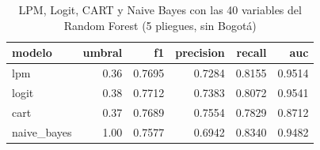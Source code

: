 \begin{table}[ht]
\centering
\begin{tabular}{lrrrrr}
  \hline
modelo & umbral & f1 & precision & recall & auc \\ 
  \hline
lpm & 0.36 & 0.7695 & 0.7284 & 0.8155 & 0.9514 \\ 
  logit & 0.38 & 0.7712 & 0.7383 & 0.8072 & 0.9541 \\ 
  cart & 0.37 & 0.7689 & 0.7554 & 0.7829 & 0.8712 \\ 
  naive\_bayes & 1.00 & 0.7577 & 0.6942 & 0.8340 & 0.9482 \\ 
   \hline
\end{tabular}
\caption{LPM, Logit, CART y Naive Bayes con las 40 variables del Random Forest (5 pliegues, sin Bogotá)} 
\end{table}
